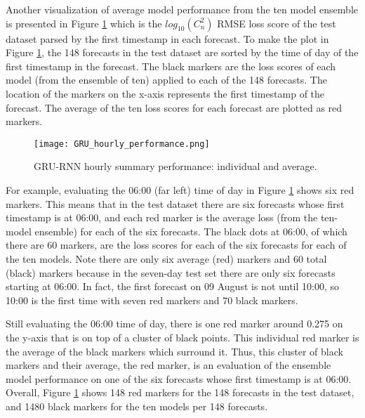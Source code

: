 Another visualization of average model performance from the ten model ensemble is presented in Figure \ref{fig:GRU_hourly_performance} which is the $log_{10}(C_{n}^{2})$ RMSE loss score of the test dataset parsed by the first timestamp in each forecast. To make the plot in Figure \ref{fig:GRU_hourly_performance}, the 148 forecasts in the test dataset are sorted by the time of day of the first timestamp in the forecast. The black markers are the loss scores of each model (from the ensemble of ten) applied to each of the 148 forecasts. The location of the markers on the x-axis represents the first timestamp of the forecast. The average of the ten loss scores for each forecast are plotted as red markers.
\begin{figure}[h!]
	\centering
	\texttt{[image: GRU\_hourly\_performance.png]}
	\caption{GRU-RNN hourly summary performance: individual and average.}
	\label{fig:GRU_hourly_performance}
\end{figure}
For example, evaluating the 06:00 (far left) time of day in Figure \ref{fig:GRU_hourly_performance} shows six red markers. This means that in the test dataset there are six forecasts whose first timestamp is at 06:00, and each red marker is the average loss (from the ten-model ensemble) for each of the six forecasts. The black dots at 06:00, of which there are 60 markers, are the loss scores for each of the six forecasts for each of the ten models. Note there are only six average (red) markers and 60 total (black) markers because in the seven-day test set there are only six forecasts starting at 06:00. In fact, the first forecast on 09 August is not until 10:00, so 10:00 is the first time with seven red markers and 70 black markers.

Still evaluating the 06:00 time of day, there is one red marker around 0.275 on the y-axis that is on top of a cluster of black points. This individual red marker is the average of the black markers which surround it. Thus, this cluster of black markers and their average, the red marker, is an evaluation of the ensemble model performance on one of the six forecasts whose first timestamp is at 06:00. Overall, Figure \ref{fig:GRU_hourly_performance} shows 148 red markers for the 148 forecasts in the test dataset, and 1480 black markers for the ten models per 148 forecasts.

